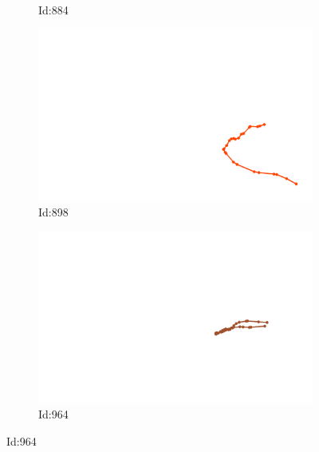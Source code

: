 \documentclass[12pt,twoside]{report}
\begin{document}
\begin{figure}
\begin{subfigure}[b]{0.20\textwidth}
\caption{Id:884}
\end{subfigure}
\begin{subfigure}[b]{0.20\textwidth}
\centering
\includegraphics[width=\textwidth]{../../trajectories/898.png}
\caption{Id:898}
\end{subfigure}
\begin{subfigure}[b]{0.20\textwidth}
\centering
\includegraphics[width=\textwidth]{../../trajectories/964.png}
\caption{Id:964}
\end{subfigure}
\end{figure}
\end{document}
